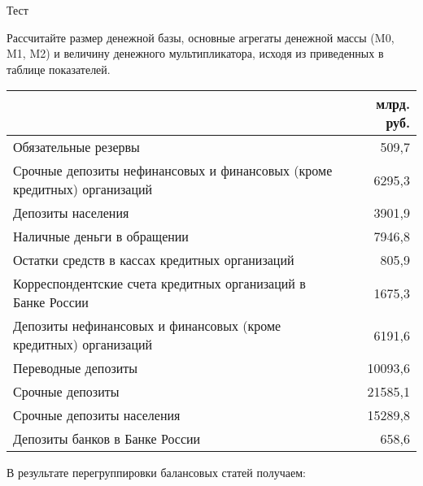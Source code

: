 \documentclass[12pt, table]{exam}
\begin{document}
\noindent
\normalsize

\begin{questions}
\question[40] Тест
\answerstotest

\pagebreak
\question[15] Рассчитайте размер денежной базы, основные агрегаты денежной массы (M0, M1, M2) и величину денежного мультипликатора, исходя из приведенных в таблице показателей.
	
\small
\begin{tabularx}{\linewidth}[b]{@{}>{\raggedright\arraybackslash}Xr@{}}		& млрд. руб.\\
	\toprule
	Обязательные резервы & 509,7 \\
	Срочные депозиты нефинансовых и финансовых (кроме кредитных) организаций & 6295,3 \\
	Депозиты населения & 3901,9 \\
	Наличные деньги в обращении & 7946,8 \\
	Остатки средств в кассах кредитных организаций & 805,9 \\
	Корреспондентские счета кредитных организаций в Банке России & 1675,3 \\
	Депозиты нефинансовых и финансовых (кроме кредитных) организаций & 6191,6 \\
	Переводные депозиты & 10093,6 \\
	Срочные депозиты & 21585,1 \\
	Срочные депозиты населения & 15289,8 \\
	Депозиты банков в Банке России & 658,6 \\
	\bottomrule
\end{tabularx}%
\normalsize
	
\begin{solution}[12em] В результате перегруппировки балансовых статей получаем:
	

\end{solution}
\end{questions}
\end{document}
